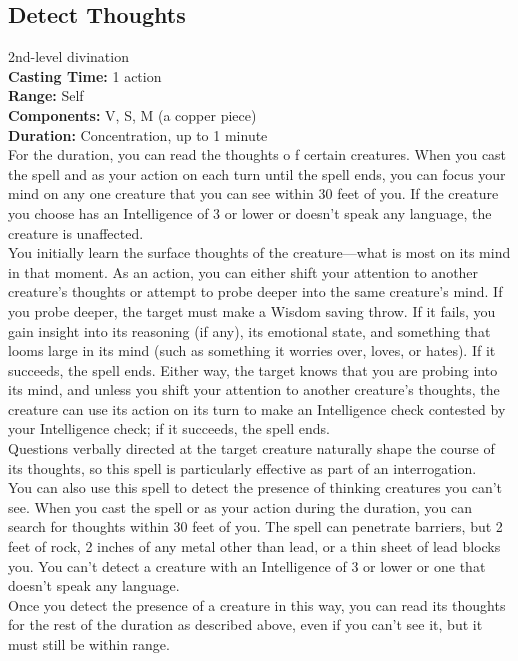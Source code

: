 \documentclass[11pt, A4paper, english]{article}
\begin{document}
		\subsection{Detect Thoughts}
2nd-level divination \\
\textbf{Casting Time:} 1 action \\
\textbf{Range:} Self \\
\textbf{Components:} V, S, M (a copper piece) \\
\textbf{Duration:} Concentration, up to 1 minute \\
For the duration, you can read the thoughts o f certain creatures. When you cast the spell and as your action on each turn until the spell ends, you can focus your mind on any one creature that you can see within 30 feet of you. If the creature you choose has an Intelligence of 3 or lower or doesn’t speak any language, the creature is unaffected. \\
You initially learn the surface thoughts of the creature—what is most on its mind in that moment. As an action, you can either shift your attention to another creature’s thoughts or attempt to probe deeper into the same creature’s mind. If you probe deeper, the target must make a Wisdom saving throw. If it fails, you gain insight into its reasoning (if any), its emotional state, and something that looms large in its mind (such as something it worries over, loves, or hates). If it succeeds, the spell ends. Either way, the target knows that you are probing into its mind, and unless you shift your attention to another creature’s thoughts, the creature can use its action on its turn to make an Intelligence check contested by your Intelligence check; if it succeeds, the spell ends. \\
Questions verbally directed at the target creature naturally shape the course of its thoughts, so this spell is particularly effective as part of an interrogation. \\
You can also use this spell to detect the presence of thinking creatures you can’t see. When you cast the spell or as your action during the duration, you can search for thoughts within 30 feet of you. The spell can penetrate barriers, but 2 feet of rock, 2 inches of any metal other than lead, or a thin sheet of lead blocks you. You can’t detect a creature with an Intelligence of 3 or lower or one that doesn’t speak any language. \\
Once you detect the presence of a creature in this way, you can read its thoughts for the rest of the duration as described above, even if you can’t see it, but it must still be within range.
\end{document}
